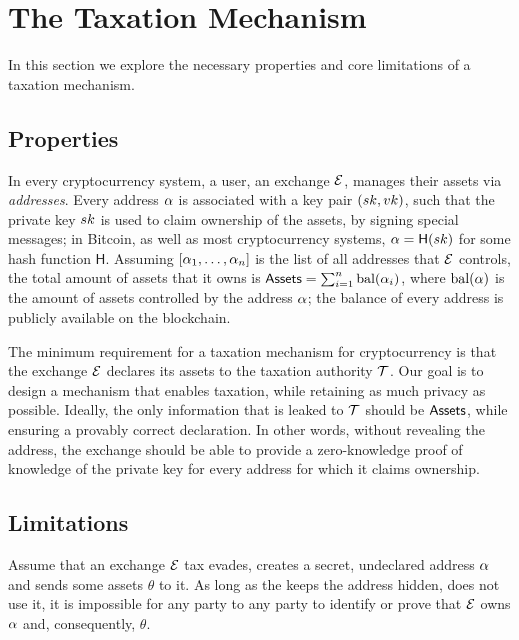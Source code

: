 \section{The Taxation Mechanism}\label{sec:taxation}

In this section we explore the necessary properties and core limitations of a
taxation mechanism.

\subsection{Properties}\label{subsec:tax-properties}

In every cryptocurrency system, a user, \eg an exchange $\mathcal{E}$, manages
their assets via \emph{addresses}. Every address $\alpha$ is associated with
a key pair $(sk, vk)$, such that the private key $sk$ is used to claim
ownership of the assets, \eg by signing special messages; in Bitcoin, as well
as most cryptocurrency systems, $\alpha = \mathsf{H}(sk)$ for some hash
function $\mathsf{H}$.  Assuming $[\alpha_1, \dots, \alpha_n]$ is the list
of all addresses that $\mathcal{E}$ controls, the total amount of assets that it
owns is $\mathsf{Assets} = \sum_{i=1}^n \text{bal}(\alpha_i)$, where
$\text{bal}(\alpha)$ is the amount of assets controlled by the address
$\alpha$; the balance of every address is publicly available on the
blockchain.

The minimum requirement for a taxation mechanism for cryptocurrency is that the
exchange $\mathcal{E}$ declares its assets to the taxation authority $\mathcal{T}$.
Our goal is to design a mechanism that enables taxation, while retaining as
much privacy as possible. Ideally, the only information that is leaked to
$\mathcal{T}$ should be $\mathsf{Assets}$, while ensuring a provably correct declaration.
In other words, without revealing the address, the exchange should be able to
provide a zero-knowledge proof of knowledge of the private key for every
address for which it claims ownership.

\subsection{Limitations}\label{subsec:tax-limitations}

Assume that an exchange $\mathcal{E}$ tax evades, \ie creates a secret,
undeclared address $\alpha$ and sends some assets $\theta$ to it. As long as
the keeps the address hidden, \ie does not use it, it is impossible for any
party to any party to identify or prove that $\mathcal{E}$ owns $\alpha$ and,
consequently, $\theta$.

